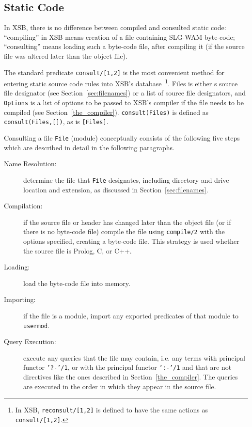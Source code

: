 \subsection{Static Code}
%
In XSB, there is no difference between compiled and consulted static
code: ``compiling'' in XSB means creation of a file containing SLG-WAM
byte-code; ``consulting'' means loading such a byte-code file, after
compiling it (if the source file was altered later than the object
file).

\begin{description}
%
The standard predicate {\tt consult/[1,2]} is the most convenient
method for entering static source code rules into XSB's
database~\footnote{In XSB, {\tt reconsult/[1,2]} is defined to have
  the same actions as {\tt consult/[1,2]}.}.  Files is either s source
file designator (see Section~\ref{sec:filenames}) or a list of source
file designators, and {\tt Options} is a list of options to be passed
to XSB's compiler if the file needs to be compiled (see
Section~\ref{the_compiler}).  {\tt consult(Files)} is defined as {\tt
  consult(Files,[])}, as is {\tt [Files]}.

Consulting a file {\tt File} (module) conceptually consists of the
following five steps which are described in detail in the following
paragraphs.
\begin{description}
\item[Name Resolution:] determine the file that {\tt File} designates,
  including directory and drive location and extension, as discussed
  in Section~\ref{sec:filenames}.
\item[Compilation:] if the source file or header has changed later
  than the object file (or if there is no byte-code file) compile the
  file using {\tt compile/2} with the options specified, creating a
  byte-code file.  This strategy is used whether the source file is
  Prolog, C, or C++.
\item[Loading:] load the byte-code file into memory. 
\item[Importing:] if the file is a module, import any exported
	predicates of that module to {\tt usermod}.
\item[Query Execution:] execute any queries that the file may contain,
  i.e. any terms with principal functor {\tt '?-'/1}, or with the
  principal functor {\tt ':-'/1} and that are not directives like the
  ones described in Section~\ref{the_compiler}.  The queries are
  executed in the order in which they appear in the source file.
\end{description}


\end{description}
